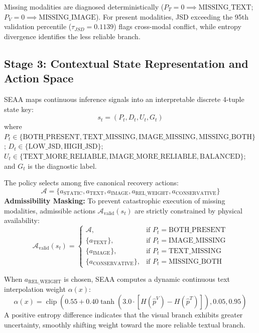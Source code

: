\documentclass[journal]{IEEEtran}
\begin{document}
Missing modalities are diagnosed deterministically ($P_T=0 \implies \text{MISSING\_TEXT}$; $P_V=0 \implies \text{MISSING\_IMAGE}$). For present modalities, JSD exceeding the 95th validation percentile ($\tau_{JSD} = 0.1139$) flags cross-modal conflict, while entropy divergence identifies the less reliable branch.

\subsection{Stage 3: Contextual State Representation and Action Space}
SEAA maps continuous inference signals into an interpretable discrete 4-tuple state key:
\begin{equation}
    s_t = (P_t, D_t, U_t, G_t)
\end{equation}
where $P_t \in \{\text{BOTH\_PRESENT}, \text{TEXT\_MISSING}, \text{IMAGE\_MISSING}, \text{MISSING\_BOTH}\}$; $D_t \in \{\text{LOW\_JSD}, \text{HIGH\_JSD}\}$; $U_t \in \{\text{TEXT\_MORE\_RELIABLE}, \text{IMAGE\_MORE\_RELIABLE}, \text{BALANCED}\}$; and $G_t$ is the diagnostic label.

The policy selects among five canonical recovery actions:
\begin{equation}
    \mathcal{A} = \{a_{\text{STATIC}}, a_{\text{TEXT}}, a_{\text{IMAGE}}, a_{\text{REL\_WEIGHT}}, a_{\text{CONSERVATIVE}}\}
\end{equation}
\textbf{Admissibility Masking:} To prevent catastrophic execution of missing modalities, admissible actions $\mathcal{A}_{\text{valid}}(s_t)$ are strictly constrained by physical availability:
\begin{equation}
    \mathcal{A}_{\text{valid}}(s_t) = \begin{cases}
    \mathcal{A}, & \text{if } P_t = \text{BOTH\_PRESENT} \\
    \{a_{\text{TEXT}}\}, & \text{if } P_t = \text{IMAGE\_MISSING} \\
    \{a_{\text{IMAGE}}\}, & \text{if } P_t = \text{TEXT\_MISSING} \\
    \{a_{\text{CONSERVATIVE}}\}, & \text{if } P_t = \text{MISSING\_BOTH}
    \end{cases}
\end{equation}

When $a_{\text{REL\_WEIGHT}}$ is chosen, SEAA computes a dynamic continuous text interpolation weight $\alpha(x)$:
\begin{equation}
    \alpha(x) = \operatorname{clip}\left( 0.55 + 0.40 \tanh\left( 3.0 \cdot [H(\hat{p}^V) - H(\hat{p}^T)] \right), 0.05, 0.95 \right)
\end{equation}
A positive entropy difference indicates that the visual branch exhibits greater uncertainty, smoothly shifting weight toward the more reliable textual branch.
\end{document}

